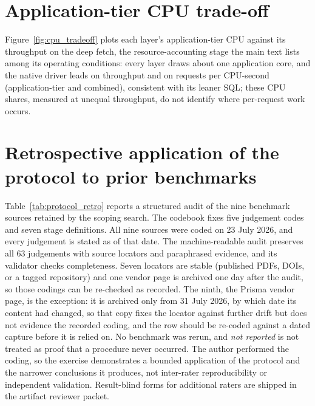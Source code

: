 \documentclass[11pt,a4paper]{article}
\newcommand{\tabledir}{tables/}
\begin{document}


\section{Application-tier CPU trade-off}
\label{sup:cpu-tradeoff}
Figure~\ref{fig:cpu_tradeoff} plots each layer's application-tier CPU against its throughput on the
deep fetch, the resource-accounting stage the main text lists among its operating conditions: every layer
draws about one application core, and the native driver leads on throughput and on requests per CPU-second (application-tier and
combined), consistent with its leaner SQL; these CPU shares, measured at unequal throughput, do not
identify where per-request work occurs.



\section{Retrospective application of the protocol to prior benchmarks}
\label{sup:protocol-retro}
Table~\ref{tab:protocol_retro} reports a structured audit of the nine benchmark sources retained by the scoping search. The codebook fixes five judgement codes and seven stage definitions. All nine sources were coded on 23 July 2026, and every judgement is stated as of that date.
The machine-readable audit preserves all 63 judgements with source locators and paraphrased evidence, and its validator checks completeness.
Seven locators are stable (published PDFs, DOIs, or a tagged repository) and one vendor page is archived one day after the audit, so those codings can be re-checked as recorded.
The ninth, the Prisma vendor page, is the exception: it is archived only from 31 July 2026, by which date its content had changed, so that copy fixes the locator against further drift but does not evidence the recorded coding, and the row should be re-coded against a dated capture before it is relied on. No benchmark was rerun, and \emph{not reported} is not treated as proof that a procedure never occurred. The author performed the coding, so the exercise demonstrates a bounded application of the protocol and the narrower conclusions it produces, not inter-rater reproducibility or independent validation. Result-blind forms for additional raters are shipped in the artifact reviewer packet.


\end{document}

